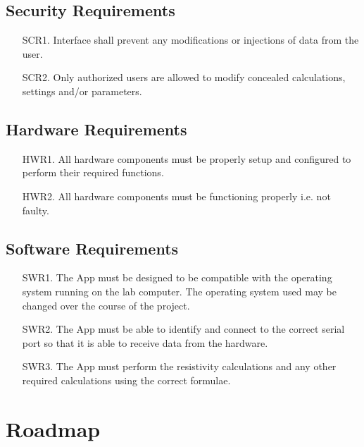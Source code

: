 \documentclass{article}
\begin{document}
\subsection*{Security Requirements}
\begin{enumerate}
  \item[SCR1.] Interface shall prevent any modifications or injections of data from the user. 
  \item[SCR2.] Only authorized users are allowed to modify concealed calculations, settings and/or parameters. \\
\end{enumerate}

\subsection*{Hardware Requirements}
\begin{enumerate}
  \item[HWR1.] All hardware components must be properly setup and configured to perform their required functions. 
  \item[HWR2.] All hardware components must be functioning properly i.e. not faulty. \\
\end{enumerate} 

\subsection*{Software Requirements}
\begin{enumerate}
  \item[SWR1.] The App must be designed to be compatible with the operating system running on the lab computer. The operating system used may be changed over the course of the project. 
  \item[SWR2.] The App must be able to identify and connect to the correct serial port so that it is able to receive data from the hardware. 
  \item[SWR3.]  The App must perform the resistivity calculations and any other required calculations using the correct formulae. \\
\end{enumerate}

\section{Roadmap}

\end{document}
